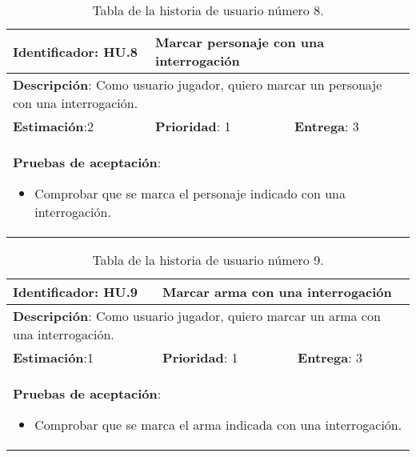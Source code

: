 \begin{table}[h]
  \begin{center}
    \begin{tabular}{|p{4cm}|p{4cm}|p{4cm}|}

    \hline
    \textbf{Identificador}: HU.8
    & \multicolumn{2}{p{8cm}|}{Marcar personaje con una interrogación}\\

    \hline
    \multicolumn{3}{|p{12cm}|}{\textbf{Descripción}: Como usuario jugador, quiero marcar un personaje con una interrogación.}\\

    \hline
    \textbf{Estimación}:2
    & \textbf{Prioridad}: 1
    & \textbf{Entrega}: 3\\

    \hline
    \multicolumn{3}{|p{12cm}|}{\textbf{Pruebas de aceptación}:
      \begin{itemize}
        \item Comprobar que se marca el personaje indicado con una interrogación.
      \end{itemize}
    }\\

    \hline

    \end{tabular}

    \caption{Tabla de la historia de usuario número 8.}
    \label{tabla-hu8}

  \end{center}
\end{table}

\begin{table}[h]
  \begin{center}
    \begin{tabular}{|p{4cm}|p{4cm}|p{4cm}|}

    \hline
    \textbf{Identificador}: HU.9
    & \multicolumn{2}{p{8cm}|}{Marcar arma con una interrogación}\\

    \hline
    \multicolumn{3}{|p{12cm}|}{\textbf{Descripción}: Como usuario jugador, quiero marcar un arma con una interrogación.}\\

    \hline
    \textbf{Estimación}:1
    & \textbf{Prioridad}: 1
    & \textbf{Entrega}: 3\\

    \hline
    \multicolumn{3}{|p{12cm}|}{\textbf{Pruebas de aceptación}:
      \begin{itemize}
        \item Comprobar que se marca el arma indicada con una interrogación.
      \end{itemize}
    }\\

    \hline

    \end{tabular}

    \caption{Tabla de la historia de usuario número 9.}
    \label{tabla-hu9}

  \end{center}
\end{table}

